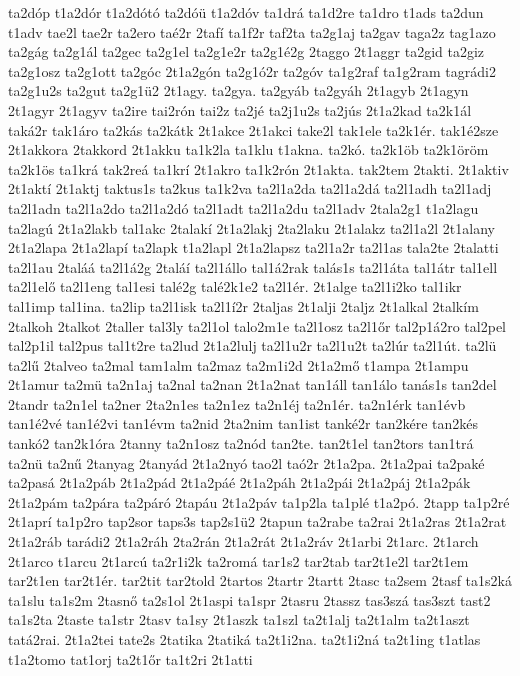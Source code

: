 {ta2dóp
t1a2dór
t1a2dótó
ta2dóü
t1a2dóv
ta1drá
ta1d2re
ta1dro
t1ads
ta2dun
t1adv
tae2l
tae2r
ta2ero
taé2r
2tafí
ta1f2r
taf2ta
ta2g1aj
ta2gav
taga2z
tag1azo
ta2gág
ta2g1ál
ta2gec
ta2g1el
ta2g1e2r
ta2g1é2g
2taggo
2t1aggr
ta2gid
ta2giz
ta2g1osz
ta2g1ott
ta2góc
2t1a2gón
ta2g1ó2r
ta2góv
ta1g2raf
ta1g2ram
tagrádi2
ta2g1u2s
ta2gut
ta2g1ü2
2t1agy.
ta2gya.
ta2gyáb
ta2gyáh
2t1agyb
2t1agyn
2t1agyr
2t1agyv
ta2ire
tai2rón
tai2z
ta2jé
ta2j1u2s
ta2jús
2t1a2kad
ta2k1ál
taká2r
tak1áro
ta2kás
ta2kátk
2t1akce
2t1akci
take2l
tak1ele
ta2k1ér.
tak1é2sze
2t1akkora
2takkord
2t1akku
ta1k2la
ta1klu
t1akna.
ta2kó.
ta2k1öb
ta2k1öröm
ta2k1ös
ta1krá
tak2reá
ta1krí
2t1akro
ta1k2rón
2t1akta.
tak2tem
2takti.
2t1aktiv
2t1aktí
2t1aktj
taktus1s
ta2kus
ta1k2va
ta2l1a2da
ta2l1a2dá
ta2l1adh
ta2l1adj
ta2l1adn
ta2l1a2do
ta2l1a2dó
ta2l1adt
ta2l1a2du
ta2l1adv
2tala2g1
t1a2lagu
ta2lagú
2t1a2lakb
tal1akc
2talakí
2t1a2lakj
2ta2laku
2t1alakz
ta2l1a2l
2t1alany
2t1a2lapa
2t1a2lapí
ta2lapk
t1a2lapl
2t1a2lapsz
ta2l1a2r
ta2l1as
tala2te
2talatti
ta2l1au
2taláá
ta2l1á2g
2taláí
ta2l1állo
tal1á2rak
talás1s
ta2l1áta
tal1átr
tal1ell
ta2l1elő
ta2l1eng
tal1esi
talé2g
talé2k1e2
ta2l1ér.
2t1alge
ta2l1i2ko
tal1ikr
tal1imp
tal1ina.
ta2lip
ta2l1isk
ta2l1í2r
2taljas
2t1alji
2taljz
2t1alkal
2talkím
2talkoh
2talkot
2taller
tal3ly
ta2l1ol
talo2m1e
ta2l1osz
ta2l1őr
tal2p1á2ro
tal2pel
tal2p1il
tal2pus
tal1t2re
ta2lud
2t1a2lulj
ta2l1u2r
ta2l1u2t
ta2lúr
ta2l1út.
ta2lü
ta2lű
2talveo
ta2mal
tam1alm
ta2maz
ta2m1i2d
2t1a2mő
t1ampa
2t1ampu
2t1amur
ta2mü
ta2n1aj
ta2nal
ta2nan
2t1a2nat
tan1áll
tan1álo
tanás1s
tan2del
2tandr
ta2n1el
ta2ner
2ta2n1es
ta2n1ez
ta2n1éj
ta2n1ér.
ta2n1érk
tan1évb
tan1é2vé
tan1é2vi
tan1évm
ta2nid
2ta2nim
tan1ist
tanké2r
tan2kére
tan2kés
tankó2
tan2k1óra
2tanny
ta2n1osz
ta2nód
tan2te.
tan2t1el
tan2tors
tan1trá
ta2nü
ta2nű
2tanyag
2tanyád
2t1a2nyó
tao2l
taó2r
2t1a2pa.
2t1a2pai
ta2paké
ta2pasá
2t1a2páb
2t1a2pád
2t1a2páé
2t1a2páh
2t1a2pái
2t1a2páj
2t1a2pák
2t1a2pám
ta2pára
ta2páró
2tapáu
2t1a2páv
ta1p2la
ta1plé
t1a2pó.
2tapp
ta1p2ré
2t1aprí
ta1p2ro
tap2sor
taps3s
tap2s1ü2
2tapun
ta2rabe
ta2rai
2t1a2ras
2t1a2rat
2t1a2ráb
tarádi2
2t1a2ráh
2ta2rán
2t1a2rát
2t1a2ráv
2t1arbi
2t1arc.
2t1arch
2t1arco
t1arcu
2t1arcú
ta2r1i2k
ta2romá
tar1s2
tar2tab
tar2t1e2l
tar2t1em
tar2t1en
tar2t1ér.
tar2tit
tar2told
2tartos
2tartr
2tartt
2tasc
ta2sem
2tasf
ta1s2ká
ta1slu
ta1s2m
2tasnő
ta2s1ol
2t1aspi
ta1spr
2tasru
2tassz
tas3szá
tas3szt
tast2
ta1s2ta
2taste
ta1str
2tasv
ta1sy
2t1aszk
ta1szl
ta2t1alj
ta2t1alm
ta2t1aszt
tatá2rai.
2t1a2tei
tate2s
2tatika
2tatiká
ta2t1i2na.
ta2t1i2ná
ta2t1ing
t1atlas
t1a2tomo
tat1orj
ta2t1őr
ta1t2ri
2t1atti
}
